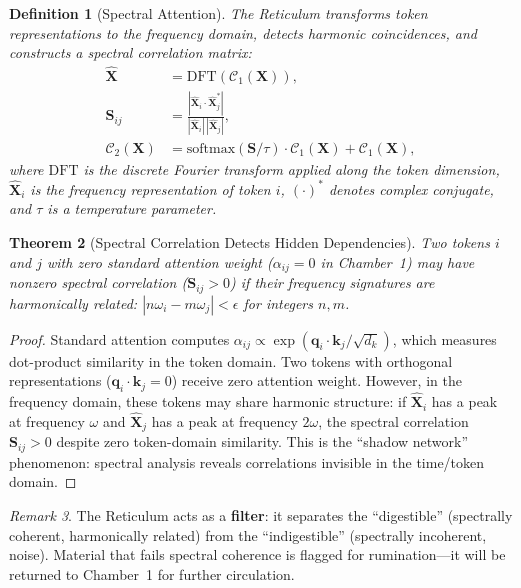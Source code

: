 \documentclass[twocolumn,10pt]{article}
\newtheorem{theorem}{Theorem}[section]
\newtheorem{definition}[theorem]{Definition}
\theoremstyle{remark}
\newtheorem{remark}[theorem]{Remark}
\newcommand{\chamber}[1]{\mathcal{C}_{#1}}
\begin{document}
\begin{definition}[Spectral Attention]
\label{def:spectral}
The Reticulum transforms token representations to the frequency domain, detects harmonic coincidences, and constructs a spectral correlation matrix:
\begin{align}
    \hat{\mathbf{X}} &= \text{DFT}(\chamber{1}(\mathbf{X})), \label{eq:dft} \\
    \mathbf{S}_{ij} &= \frac{|\hat{\mathbf{X}}_i \cdot \hat{\mathbf{X}}_j^*|}{|\hat{\mathbf{X}}_i| \, |\hat{\mathbf{X}}_j|}, \label{eq:spectral_corr} \\
    \chamber{2}(\mathbf{X}) &= \text{softmax}(\mathbf{S} / \tau) \cdot \chamber{1}(\mathbf{X}) + \chamber{1}(\mathbf{X}), \label{eq:reticulum}
\end{align}
where $\text{DFT}$ is the discrete Fourier transform applied along the token dimension, $\hat{\mathbf{X}}_i$ is the frequency representation of token $i$, $(\cdot)^*$ denotes complex conjugate, and $\tau$ is a temperature parameter.
\end{definition}

\begin{theorem}[Spectral Correlation Detects Hidden Dependencies]
\label{thm:spectral_hidden}
Two tokens $i$ and $j$ with zero standard attention weight ($\alpha_{ij} = 0$ in Chamber~1) may have nonzero spectral correlation ($\mathbf{S}_{ij} > 0$) if their frequency signatures are harmonically related: $|n\omega_i - m\omega_j| < \epsilon$ for integers $n, m$.
\end{theorem}

\begin{proof}
Standard attention computes $\alpha_{ij} \propto \exp(\mathbf{q}_i \cdot \mathbf{k}_j / \sqrt{d_k})$, which measures dot-product similarity in the token domain.  Two tokens with orthogonal representations ($\mathbf{q}_i \cdot \mathbf{k}_j = 0$) receive zero attention weight.  However, in the frequency domain, these tokens may share harmonic structure: if $\hat{\mathbf{X}}_i$ has a peak at frequency $\omega$ and $\hat{\mathbf{X}}_j$ has a peak at frequency $2\omega$, the spectral correlation $\mathbf{S}_{ij} > 0$ despite zero token-domain similarity.  This is the ``shadow network'' phenomenon: spectral analysis reveals correlations invisible in the time/token domain.
\end{proof}

\begin{remark}
The Reticulum acts as a \textbf{filter}: it separates the ``digestible'' (spectrally coherent, harmonically related) from the ``indigestible'' (spectrally incoherent, noise).  Material that fails spectral coherence is flagged for rumination---it will be returned to Chamber~1 for further circulation.
\end{remark}
\end{document}
